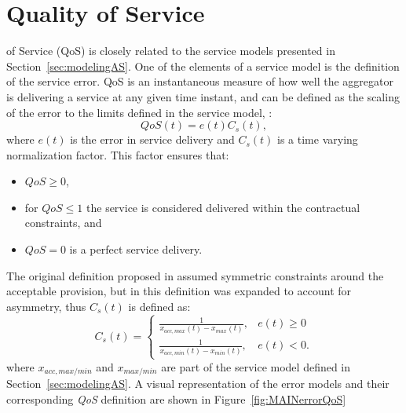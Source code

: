 \section{Quality of Service}\label{sec:MAINQoS}
 of Service (QoS) is closely related to the service models presented in Section~\ref{sec:modelingAS}. One of the elements of a service model is the definition of the service error. QoS is an instantaneous measure of how well the aggregator is delivering a service at any given time instant, and can be defined as the scaling of the error to the limits defined in the service model, \ie:
\begin{equation}
	QoS(t) = e(t)C_s(t),
\end{equation}
where $e(t)$ is the error in service delivery and $C_s(t)$ is a time varying normalization factor. This factor ensures that:
\begin{itemize}
	\item $QoS \geq 0$,
	\item for $QoS \leq 1$ the service is considered delivered within the contractual constraints, and
	\item $QoS = 0$ is a perfect service delivery.
\end{itemize}

The original definition proposed in \cite{bondy2014performance} assumed symmetric constraints around the acceptable provision, but in \cite{bondy2016method} this definition was expanded to account for asymmetry, thus $C_s(t)$ is defined as:
\begin{equation}
C_{s}(t) = 
\begin{cases}
\frac{1}{x_{acc,max}(t) - x_{max}(t)}, & e(t) \geq 0 \\
\frac{1}{x_{acc,min}(t) - x_{min}(t)}, & e(t) < 0.
\end{cases}\label{eq:MAINcst}
\end{equation}
where $x_{acc,max/min}$ and $x_{max/min}$ are part of the service model defined in Section~\ref{sec:modelingAS}. A visual representation of the error models and their corresponding \emph{QoS} definition are shown in Figure~\ref{fig:MAINerrorQoS}

